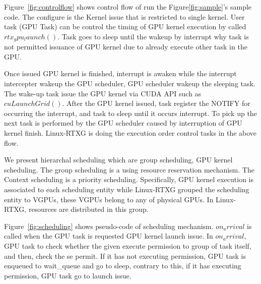 Figure~\ref{fig:controlflow} shows control flow of run the Figure\ref{fig:sample}'s sample code.
The configure is the Kernel issue that is restricted to single kernel.
User task (GPU Task) can be control the timing of GPU kernel execution by called $rtx_gpu_launch()$.
Task goes to sleep until the wakeup by interrupt why task is not permitted issuance of GPU kernel due to already execute other task in the GPU.

Once issued GPU kernel is finished,
interrupt is awaken while the interrupt intercepter wakeup the GPU scheduler, GPU scheduler wakeup the sleeping task. 
The wake-up task issue the GPU kernel via CUDA API such as $cuLaunchGrid()$.
After the GPU kernel issued, task register the NOTIFY for occurring the interrupt,
and task to sleep until it occurs interrupt.
To pick up the next task is performed by the GPU scheduler caused by interruption of GPU kernel finish.
Linux-RTXG is doing the execution order control tasks in the above flow.

We present hierarchal scheduling which are group scheduling, GPU kernel scheduling.
The group scheduling is a using resource reservation mechanism.
The Context scheduling is a priority scheduling.
Specifically, GPU kernel execution is associated to each scheduling entity while Linux-RTXG grouped the scheduling entity to VGPUs, these VGPUs belong to any of physical GPUs.
In Linux-RTXG, resources are distributed in this group.

Figure~\ref{fig:scheduling} shows pseudo-code of scheduling mechanism.
$on_arrival$ is called when the GPU task is requested GPU kernel launch issue.
In $on_arrival$, GPU task to check whether the given execute permission to group of task itself, and then, check the se permit.
If it has not executing permission, GPU task is enqueued to wait\_queue and go to sleep,
contrary to this, if it has executing permission, GPU task go to launch issue.

